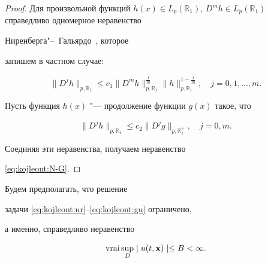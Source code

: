 \smallskip



\begin{proof}

Для произвольной функций $h(x)\in L_p(\mathbb{R}_{1})$, $D^m h\in

L_p(\mathbb{R}_{1})$  справедливо одномерное неравенство

Ниренберга"--~Гальярдо~\cite{kojleont:bib:nirenberg}, которое

запишем в частном случае:

$$

\|D^jh\|_{p,\mathbb{R}_{1}}\leq c_1

\|D^mh\|_{p,\mathbb{R}_{1}}^{\frac{j}{m}}

\|h\|_{p,\mathbb{R}_1}^{1-\frac{j}{m}},\quad

j=0, 1, \dots, m.

$$

Пусть функция $h(x)$ "--- продолжение функции $g(x)$ такое, что

$$

\|D^jh\|_{p,\mathbb{R}_{1}}\leq c_2\|D^j g\|_{p,\mathbb{R}_{1}^+},\quad

j=\overline{0,m}.

$$

Соединяя эти неравенства, получаем неравенство

\eqref{eq:kojleont:N-G}.

\end{proof}



\smallskip



  Будем предполагать, что решение

задачи \eqref{eq:kojleont:ur}--\eqref{eq:kojleont:gu} ограничено,

а именно, справедливо неравенство

\begin{equation}

\label{eq:kojleont:prop}

{\rm vrai}\sup\limits_{D}\mid u(t,{\bf x})\mid\leq B<\infty.

\end{equation}



